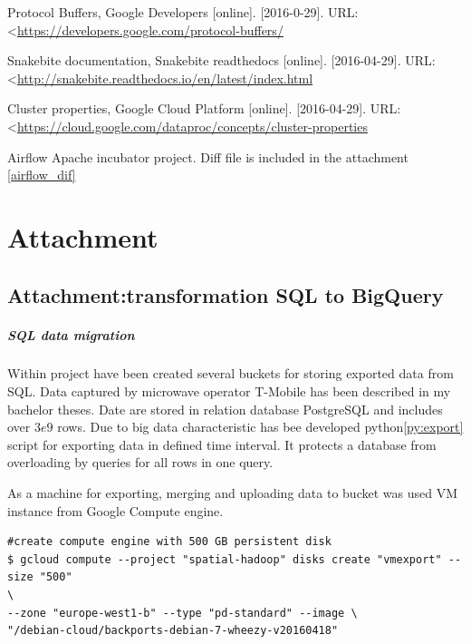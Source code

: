 \documentclass[a4paper,12pt,oneside]{report}
\begin{document}
\begin{thebibliography}{99}
		Protocol Buffers, Google Developers [online]. [2016-0-29]. 
		URL: \textless\url{https://developers.google.com/protocol-buffers/}
		
		Snakebite documentation, Snakebite readthedocs [online]. [2016-04-29]. 
		URL: \textless\url{http://snakebite.readthedocs.io/en/latest/index.html}
		
		Cluster properties, Google Cloud Platform [online]. [2016-04-29]. 
		URL:
		\textless\url{https://cloud.google.com/dataproc/concepts/cluster-properties}
		
		
		Airflow Apache incubator project. Diff file is included in the attachment
		\ref{airflow_dif}
		
		
		
		
	\end{thebibliography}
	
	
	
	
	\setcounter{footnote}{1}
	\newpage
	
	\appendix
	\chapter*{Attachment}
	\section{Attachment:transformation SQL to BigQuery}
		\paragraph{SQL data migration} Within project have been created several buckets
		for storing exported data from SQL. Data captured by microwave operator T-Mobile has been 
		described	in my bachelor theses\cite{bp_krejci}. 	Date are stored in relation database 
		PostgreSQL and includes over $3e9$ rows. Due to big data characteristic has bee	developed python\ref{py:export} %
		script for exporting data in defined time interval. It protects a database from overloading by queries for all rows in one	query. 
		
		As a machine for exporting, merging and uploading data to bucket was used VM
		instance from Google Compute engine.
		
		\begin{footnotesize}
			\begin{lstlisting}[style=mybash]
#create compute engine with 500 GB persistent disk
$ gcloud compute --project "spatial-hadoop" disks create "vmexport" --size "500"
\
--zone "europe-west1-b" --type "pd-standard" --image \
"/debian-cloud/backports-debian-7-wheezy-v20160418"
			\end{lstlisting}
		\end{footnotesize}
		
\end{document}

